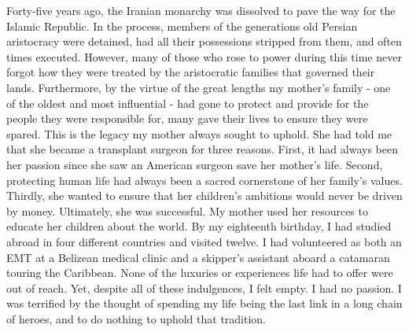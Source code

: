 \documentclass{article}
\begin{document}
\author{Armon Shariati}
\title{}
\date{}
\maketitle

Forty-five years ago, the Iranian monarchy was dissolved to pave the way for
the Islamic Republic. In the process, members of the generations old Persian
aristocracy were detained, had all their possessions stripped from them, and
often times executed. However, many of those who rose to power during this time
never forgot how they were treated by the aristocratic families that governed
their lands. Furthermore, by the virtue of the great lengths my mother's family
- one of the oldest and most influential - had gone to protect and provide for
the people they were responsible for, many gave their lives to ensure they were
spared. This is the legacy my mother always sought to uphold. She had told me
that she became a transplant surgeon for three reasons. First, it had always
been her passion since she saw an American surgeon save her mother's life.
Second, protecting human life had always been a sacred cornerstone of her
family's values. Thirdly, she wanted to ensure that her children's ambitions
would never be driven by money. Ultimately, she was successful. My mother used
her resources to educate her children about the world.  By my eighteenth
birthday, I had studied abroad in four different countries and visited twelve.
I had volunteered as both an EMT at a Belizean medical clinic and a skipper's
assistant aboard a catamaran touring the Caribbean.  None of the luxuries or
experiences life had to offer were out of reach. Yet, despite all of these
indulgences, I felt empty. I had no passion.  I was terrified by the thought of
spending my life being the last link in a long chain of heroes, and to do
nothing to uphold that tradition.
\end{document}
